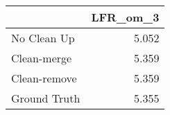 \begin{tabular}{lr}
\toprule
{} & LFR_om_3 \\
\midrule
No Clean Up  &    5.052 \\
Clean-merge  &    5.359 \\
Clean-remove &    5.359 \\
Ground Truth &    5.355 \\
\bottomrule
\end{tabular}
